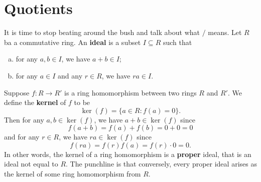 \documentclass{article}
\begin{document}
    \section{Quotients}

It is time to stop beating around the bush and talk about what $/$ means. Let $R$ ba a commutative ring. An \textbf{ideal} is a subset $I\subseteq R$ such that
\begin{enumerate}[(a)]
    \item for any $a,b\in I$, we have $a + b \in I$;
    \item for any $a\in I$ and any $r\in R$, we have $ra\in I$.
\end{enumerate}
Suppose $f:R\rightarrow R'$ is a ring homomorphism between two rings $R$ and $R'$. We define the \textbf{kernel} of $f$ to be $$\ker(f) = \{a\in R\colon f(a) = 0\}.$$
Then for any $a,b\in \ker(f)$, we have $a + b\in\ker(f)$ since
$$f(a+b) = f(a) + f(b) = 0 + 0 = 0$$
and for any $r\in R$, we have $ra\in\ker(f)$ since
$$f(ra) = f(r)f(a) = f(r)\cdot 0 = 0.$$
In other words, the kernel of a ring homomorphism is a \textbf{proper} ideal, that is an ideal not equal to $R$. The punchline is that conversely, every proper ideal arises as the kernel of some ring homomorphism from $R$.
\end{document}
